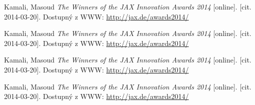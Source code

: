 \begin{thebibliography}{10}

Kamali, Masoud \emph{The Winners of the JAX Innovation Awards 2014}
{[}online]. {[}cit. 2014-03-20]. Dostupný z WWW: \url{http://jax.de/awards2014/}

Kamali, Masoud \emph{The Winners of the JAX Innovation Awards 2014}
{[}online]. {[}cit. 2014-03-20]. Dostupný z WWW: \url{http://jax.de/awards2014/}

Kamali, Masoud \emph{The Winners of the JAX Innovation Awards 2014}
{[}online]. {[}cit. 2014-03-20]. Dostupný z WWW: \url{http://jax.de/awards2014/}

Kamali, Masoud \emph{The Winners of the JAX Innovation Awards 2014}
{[}online]. {[}cit. 2014-03-20]. Dostupný z WWW: \url{http://jax.de/awards2014/}

\end{thebibliography}